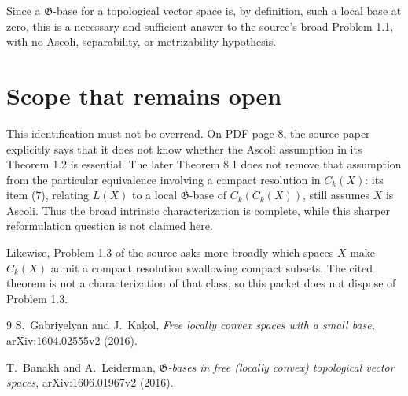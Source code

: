\documentclass[11pt]{article}
\begin{document}
Since a $\mathfrak G$-base for a topological vector space is, by definition,
such a local base at zero, this is a necessary-and-sufficient answer to the
source's broad Problem 1.1, with no Ascoli, separability, or metrizability
hypothesis.

\section{Scope that remains open}

This identification must not be overread.  On PDF page 8, the source paper
explicitly says that it does not know whether the Ascoli assumption in its
Theorem 1.2 is essential.  The later Theorem 8.1 does not remove that
assumption from the particular equivalence involving a compact resolution in
$C_k(X)$: its item (7), relating $L(X)$ to a local $\mathfrak G$-base of
$C_k(C_k(X))$, still assumes $X$ is Ascoli.  Thus the broad intrinsic
characterization is complete, while this sharper reformulation question is
not claimed here.

Likewise, Problem 1.3 of the source asks more broadly which spaces $X$ make
$C_k(X)$ admit a compact resolution swallowing compact subsets.  The cited
theorem is not a characterization of that class, so this packet does not
dispose of Problem 1.3.

\begin{thebibliography}{9}
S.~Gabriyelyan and J.~Ka\c{k}ol,
\emph{Free locally convex spaces with a small base},
arXiv:1604.02555v2 (2016).

T.~Banakh and A.~Leiderman,
\emph{$\mathfrak G$-bases in free (locally convex) topological vector spaces},
arXiv:1606.01967v2 (2016).
\end{thebibliography}
\end{document}
